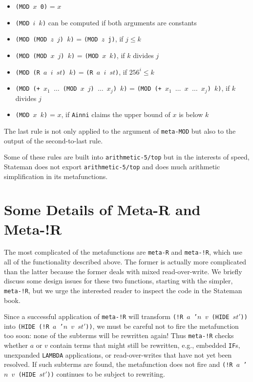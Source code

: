 \documentclass[submission,copyright,creativecommons]{eptcs}
\newcommand{\ptt}[1]{\tt{#1}}
\begin{document}
\begin{itemize}
\item {\ptt{(MOD $x$ 0)}} = $x$

\item {\ptt{(MOD $i$ $k$)}} can be computed if both arguments are constants

\item {\ptt{(MOD (MOD $z$ $j$) $k$)}} = {\ptt{(MOD $z$ j)}}, if $j \leq k$
\item {\ptt{(MOD (MOD $x$ $j$) $k$)}} = {\ptt{(MOD $x$ $k$)}}, if $k$ divides $j$
\item {\ptt{(MOD (R $a$ $i$ $st$) $k$)}} = {\ptt{(R $a$ $i$ $st$)}}, if $256^i \leq k$
\item {\ptt{(MOD (+ $x_1$ $\ldots$ (MOD $x$ $j$) $\ldots$ $x_j$) $k$)}} = {\ptt{(MOD (+ $x_1$ $\ldots$ $x$ $\ldots$ $x_j$) $k$)}}, if $k$ divides $j$
\item {\ptt{(MOD $x$ $k$)}} = $x$, if {\ptt{Ainni}} claims the upper bound of $x$ is below $k$
\end{itemize}

The last rule is not only applied to the argument of {\ptt{meta-MOD}} but
also to the output of the second-to-last rule.

Some of these rules are built into {\ptt{arithmetic-5/top}} but in the
interests of speed, Stateman does not export {\ptt{arithmetic-5/top}} and
does much arithmetic simplification in its metafunctions.

\section{Some Details of Meta-R and Meta-!R}

The most complicated of the metafunctions are {\ptt{meta-R}} and
{\ptt{meta-!R}}, which use all of the functionality described above.  The
former is actually more complicated than the latter because the former deals
with mixed read-over-write.  We briefly discuss some design issues for these
two functions, starting with the simpler, {\ptt{meta-!R}}, but we urge the
interested reader to inspect the code in the Stateman book.

Since a successful application of {\ptt{meta-!R}} will transform {\ptt{(!R
    $a$ '$n$ $v$ (HIDE $st'$))}} into {\ptt{(HIDE (!R $a$ '$n$ $v$ $st'$))}}, we
must be careful not to fire the metafunction too soon: none of the subterms
will be rewritten again!  Thus {\ptt{meta-!R}} checks whether $a$ or $v$ contain
terms that might still be rewritten, e.g., embedded {\ptt{IF}}s, unexpanded
{\ptt{LAMBDA}} applications, or read-over-writes that have not yet been
resolved.  If such subterms are found, the metafunction does not fire and
{\ptt{(!R $a$ '$n$ $v$ (HIDE $st'$))}} continues to be subject to rewriting.
\end{document}
